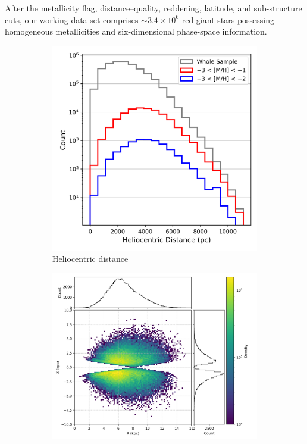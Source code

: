 \documentclass[a4paper,12pt]{article}
\begin{document}
After the metallicity flag, distance–quality, reddening, latitude, and 
sub-structure cuts, our working data set comprises $\sim3.4\times10^{6}$ 
red-giant stars possessing homogeneous metallicities and six-dimensional 
phase-space information.  

\begin{figure}
  \centering
  \begin{subfigure}[b]{0.32\textwidth}
    \includegraphics[width=\textwidth]{../figures/distance_histogram.png}
    \caption{Heliocentric distance}
    \label{fig:dist_hist}
  \end{subfigure}\hfill
  \begin{subfigure}[b]{0.32\textwidth}
    \includegraphics[width=\textwidth]{../figures/ZR_distribution.png}

\end{subfigure}
\end{figure}
\end{document}
